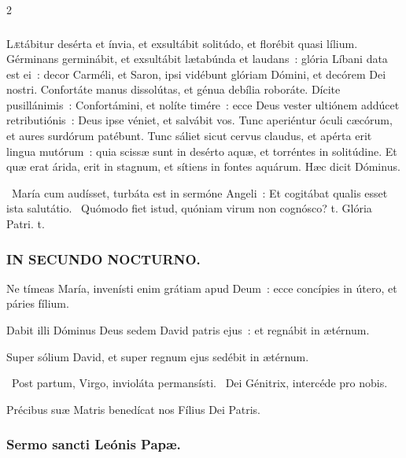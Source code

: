 \documentclass[9pt,twoside]{extarticle}
\begin{document}
\begin{multicols}{2}
{{\subsubsection*{}
\lettrine{L}ætábitur desérta et ínvia, et exsultábit solitúdo, et florébit quasi lílium.
Gérminans germinábit, et exsultábit lætabúnda et laudans~: glória Líbani data est ei~: decor Carméli, et Saron, ipsi vidébunt glóriam Dómini, et decórem Dei nostri.
Confortáte manus dissolútas, et génua debília roboráte.
Dícite pusillánimis~: Confortámini, et nolíte timére~: ecce Deus vester ultiónem addúcet retributiónis~: Deus ipse véniet, et salvábit vos.
Tunc aperiéntur óculi cæcórum, et aures surdórum patébunt.
Tunc sáliet sicut cervus claudus, et apérta erit lingua mutórum~: quia scissæ sunt in desérto aquæ, et torréntes in solitúdine.
Et quæ erat árida, erit in stagnum, et sítiens in fontes aquárum. Hæc dicit Dóminus.

\begin{tightlist}{}
\item {}~María cum audísset, turbáta est in sermóne Angeli~: \textred{*} Et cogitábat qualis esset ista salutátio. ~Quómodo fiet istud, quóniam virum non cognósco? t. Glória Patri. t.
\end{tightlist}

\subsubsection*{\center \textsc{IN SECUNDO NOCTURNO.}}
\begin{tightlist}{}
\item {} Ne tímeas María, invenísti enim grátiam apud Deum~: ecce concípies in útero, et páries fílium.
\item {} Dabit illi Dóminus Deus sedem David patris ejus~: et regnábit in ætérnum.
\item {} Super sólium David, et super regnum ejus sedébit in ætérnum.
\item {}~Post partum, Virgo, invioláta permansísti. ~Dei Génitrix, intercéde pro nobis.
\item {\small {} Précibus suæ Matris benedícat nos Fílius Dei Patris.}
\end{tightlist}

\subsubsection*{\center Sermo sancti Leónis Papæ.}
}}
\end{multicols}
\end{document}
